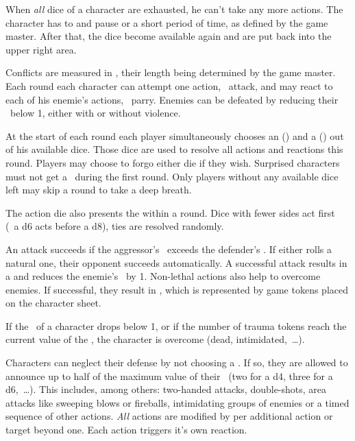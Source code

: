{		When \emph{all} dice of a character are exhausted, he can't take any more actions. The character has to  and pause or a short period of time, as defined by the game master. After that, the dice become available again and are put back into the upper right area.


		\noindent
		Conflicts are measured in , their length being determined by the game master. Each round each character can attempt one action, \eg\ attack, and may react to each of his enemie's actions, \eg\ parry. Enemies can be defeated by reducing their \HD\ below 1, either with or without violence.

		At the start of each round each player simultaneously chooses an  (\AD) and a  (\RD) out of his available dice. Those dice are used to resolve all actions and reactions this round. Players may choose to forgo either die if they wish. Surprised characters must not get a \AD\ during the first round. Only players without any available dice left may skip a round to take a deep breath.

		The action die also presents the  within a round. Dice with fewer sides act first (\eg\ a d6 acts before a d8), ties are resolved randomly.

		An attack succeeds if the aggressor's \AD\ exceeds the defender's \RD. If either rolls a natural one, their opponent succeeds automatically. A successful attack results in a  and reduces the enemie's \HD\ by 1. Non-lethal actions also help to overcome enemies. If successful, they result in , which is represented by game tokens placed on the character sheet.

		If the \HD~of a character drops below 1, or if the number of trauma tokens reach the current value of the \HD, the character is overcome (dead, intimidated,~\ldots).

		Characters can neglect their defense by not choosing a \RD. If so, they are allowed to announce  up to half of the maximum value of their \AD~(two for a d4, three for a d6,~\ldots). This includes, among others: two-handed attacks, double-shots, area attacks like sweeping blows or fireballs, intimidating groups of enemies or a timed sequence of other actions. \emph{All} actions are modified by  per additional action or target beyond one. Each action triggers it's own reaction.

}
